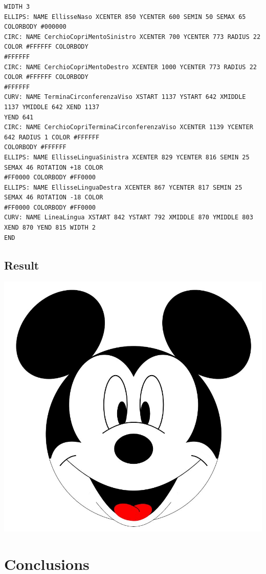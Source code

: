 \documentclass[a4paper]{article}
\begin{document}
\begin{verbatim}
WIDTH 3
ELLIPS: NAME EllisseNaso XCENTER 850 YCENTER 600 SEMIN 50 SEMAX 65 COLORBODY #000000
CIRC: NAME CerchioCopriMentoSinistro XCENTER 700 YCENTER 773 RADIUS 22 COLOR #FFFFFF COLORBODY
#FFFFFF
CIRC: NAME CerchioCopriMentoDestro XCENTER 1000 YCENTER 773 RADIUS 22 COLOR #FFFFFF COLORBODY
#FFFFFF
CURV: NAME TerminaCirconferenzaViso XSTART 1137 YSTART 642 XMIDDLE 1137 YMIDDLE 642 XEND 1137
YEND 641
CIRC: NAME CerchioCopriTerminaCirconferenzaViso XCENTER 1139 YCENTER 642 RADIUS 1 COLOR #FFFFFF
COLORBODY #FFFFFF
ELLIPS: NAME EllisseLinguaSinistra XCENTER 829 YCENTER 816 SEMIN 25 SEMAX 46 ROTATION +18 COLOR
#FF0000 COLORBODY #FF0000
ELLIPS: NAME EllisseLinguaDestra XCENTER 867 YCENTER 817 SEMIN 25 SEMAX 46 ROTATION -18 COLOR
#FF0000 COLORBODY #FF0000
CURV: NAME LineaLingua XSTART 842 YSTART 792 XMIDDLE 870 YMIDDLE 803 XEND 870 YEND 815 WIDTH 2
END
\end{verbatim}

\newpage

\subsection{Result}
\includegraphics[scale=0.76]{Topolino.JPG} 

\newpage

\section{Conclusions}
\end{document}
